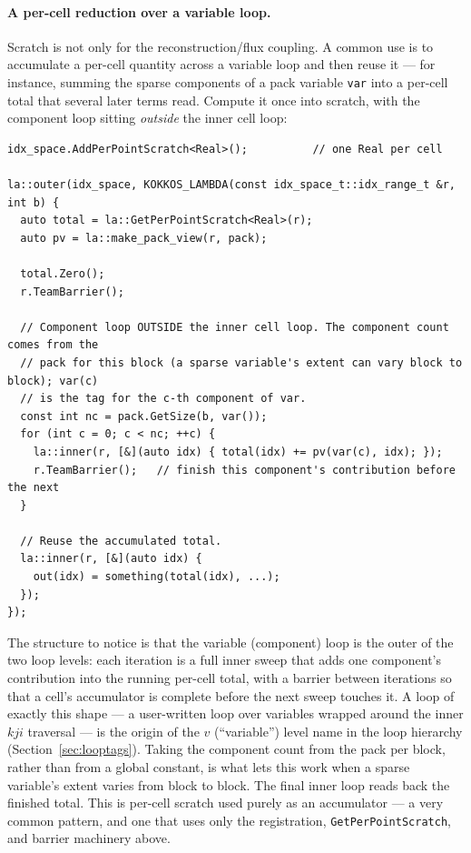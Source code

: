 \documentclass[11pt]{article}
\newcommand{\code}[1]{\lstinline[basicstyle=\ttfamily]|#1|}
\begin{document}
\paragraph{A per-cell reduction over a variable loop.} Scratch is not only for the
reconstruction/flux coupling. A common use is to accumulate a per-cell quantity
across a variable loop and then reuse it --- for instance, summing the sparse
components of a pack variable \code{var} into a per-cell total that several later
terms read. Compute it once into scratch, with the component loop sitting
\emph{outside} the inner cell loop:
\begin{lstlisting}
idx_space.AddPerPointScratch<Real>();          // one Real per cell

la::outer(idx_space, KOKKOS_LAMBDA(const idx_space_t::idx_range_t &r, int b) {
  auto total = la::GetPerPointScratch<Real>(r);
  auto pv = la::make_pack_view(r, pack);

  total.Zero();
  r.TeamBarrier();

  // Component loop OUTSIDE the inner cell loop. The component count comes from the
  // pack for this block (a sparse variable's extent can vary block to block); var(c)
  // is the tag for the c-th component of var.
  const int nc = pack.GetSize(b, var());
  for (int c = 0; c < nc; ++c) {
    la::inner(r, [&](auto idx) { total(idx) += pv(var(c), idx); });
    r.TeamBarrier();   // finish this component's contribution before the next
  }

  // Reuse the accumulated total.
  la::inner(r, [&](auto idx) {
    out(idx) = something(total(idx), ...);
  });
});
\end{lstlisting}
The structure to notice is that the variable (component) loop is the outer of the
two loop levels: each iteration is a full inner sweep that adds one component's
contribution into the running per-cell total, with a barrier between iterations so
that a cell's accumulator is complete before the next sweep touches it. A loop of
exactly this shape --- a user-written loop over variables wrapped around the inner
$kji$ traversal --- is the origin of the $v$ (``variable'') level name in the loop
hierarchy (Section~\ref{sec:looptags}). Taking the component count from the pack
per block, rather than from a global constant, is what lets this work when a sparse
variable's extent varies from block to block. The final inner loop reads back the
finished total. This is per-cell scratch used
purely as an accumulator --- a very common pattern, and one that uses only the
registration, \code{GetPerPointScratch}, and barrier machinery above.
\end{document}
